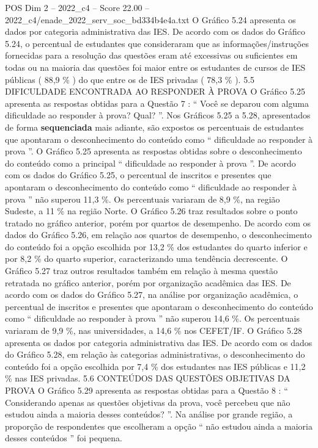 \begin{textsample}{POS Dim 2 – 2022\_c4 – Score 22.00 – 2022\_c4/enade\_2022\_serv\_soc\_bd334b4e4a.txt}
O Gráfico 5.24 apresenta os dados por categoria administrativa das IES.
De acordo com os dados do Gráfico 5.24, o percentual de estudantes que consideraram que as informações/instruções fornecidas para a resolução das questões eram até excessivas ou suficientes em todas ou na maioria das questões foi maior entre os estudantes de cursos de IES públicas ( 88,9 \% ) do que entre os de IES privadas ( 78,3 \% ). 5.5 DIFICULDADE ENCONTRADA AO RESPONDER À PROVA O Gráfico 5.25 apresenta as respostas obtidas para a Questão 7 : “ Você se deparou com alguma dificuldade ao responder à prova?
Qual? ”.
Nos Gráficos 5.25 a 5.28, apresentados de forma \textbf{sequenciada} mais adiante, são expostos os percentuais de estudantes que apontaram o desconhecimento do conteúdo como “ dificuldade ao responder à prova ”.
O Gráfico 5.25 apresenta as respostas obtidas sobre o desconhecimento do conteúdo como a principal “ dificuldade ao responder à prova ”.
De acordo com os dados do Gráfico 5.25, o percentual de inscritos e presentes que apontaram o desconhecimento do conteúdo como “ dificuldade ao responder à prova ” não superou 11,3 \%.
Os percentuais variaram de 8,9 \%, na região Sudeste, a 11 \% na região Norte.
O Gráfico 5.26 traz resultados sobre o ponto tratado no gráfico anterior, porém por quartos de desempenho.
De acordo com os dados do Gráfico 5.26, em relação aos quartos de desempenho, o desconhecimento do conteúdo foi a opção escolhida por 13,2 \% dos estudantes do quarto inferior e por 8,2 \% do quarto superior, caracterizando uma tendência decrescente.
O Gráfico 5.27 traz outros resultados também em relação à mesma questão retratada no gráfico anterior, porém por organização acadêmica das IES.
De acordo com os dados do Gráfico 5.27, na análise por organização acadêmica, o percentual de inscritos e presentes que apontaram o desconhecimento do conteúdo como “ dificuldade ao responder à prova ” não superou 14,6 \%.
Os percentuais variaram de 9,9 \%, nas universidades, a 14,6 \% nos CEFET/IF.
O Gráfico 5.28 apresenta os dados por categoria administrativa das IES.
De acordo com os dados do Gráfico 5.28, em relação às categorias administrativas, o desconhecimento do conteúdo foi a opção escolhida por 7,4 \% dos estudantes nas IES públicas e 11,2 \% nas IES privadas. 5.6 CONTEÚDOS DAS QUESTÕES OBJETIVAS DA PROVA O Gráfico 5.29 apresenta as respostas obtidas para a Questão 8 : “ Considerando apenas as questões objetivas da prova, você percebeu que não estudou ainda a maioria desses conteúdos? ”.
Na análise por grande região, a proporção de respondentes que escolheram a opção “ não estudou ainda a maioria desses conteúdos ” foi pequena.

\end{textsample}
